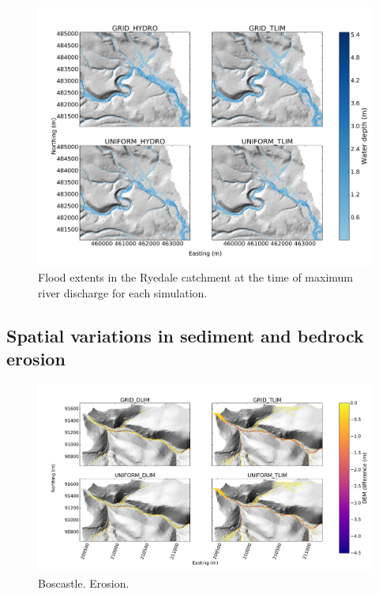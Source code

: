 \begin{figure}
\includegraphics[width=17cm]{chp06_figures_scripts/figure_ryedale_peak_flood_ensemble.png}
\caption{Flood extents in the Ryedale catchment at the time of maximum river discharge for each simulation.}
\label{fig_ryedale_2dplan_flood_ensemble}
\end{figure}

\subsection{Spatial variations in sediment and bedrock erosion}

\begin{figure}
\includegraphics[width=22cm]{chp06_figures_scripts/figure_boscastle_erosion_diff_ensemble10.jpg}
\caption{Boscastle. Erosion.}
\label{fig_boscastle_2dplan_erosion_ensemble}
\end{figure}

